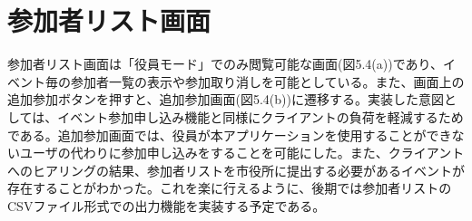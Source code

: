 \section{参加者リスト画面}%
参加者リスト画面は「役員モード」でのみ閲覧可能な画面(図5.4(a))であり、イベント毎の参加者一覧の表示や参加取り消しを可能としている。また、画面上の追加参加ボタンを押すと、追加参加画面(図5.4(b))に遷移する。実装した意図としては、イベント参加申し込み機能と同様にクライアントの負荷を軽減するためである。追加参加画面では、役員が本アプリケーションを使用することができないユーザの代わりに参加申し込みをすることを可能にした。また、クライアントへのヒアリングの結果、参加者リストを市役所に提出する必要があるイベントが存在することがわかった。これを楽に行えるように、後期では参加者リストのCSVファイル形式での出力機能を実装する予定である。

